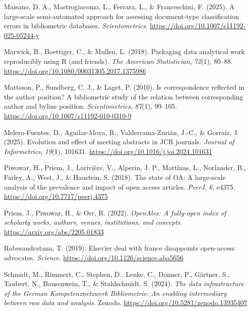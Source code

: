 \documentclass[a4paper,man,floatsintext,longtable,noextraspace,10pt]{apa6}
\newlength{\cslhangindent}
\newenvironment{CSLReferences}[2] %
{\begin{list}{}{%
  \setlength{\itemindent}{0pt}
  \setlength{\leftmargin}{0pt}
  \setlength{\parsep}{0pt}
  \ifodd #1
  \setlength{\leftmargin}{\cslhangindent}
  \setlength{\itemindent}{-1\cslhangindent}
  \fi
  \setlength{\itemsep}{#2\baselineskip}}}
{\end{list}}
\begin{document}
\begin{CSLReferences}{1}{0}
Maisano, D. A., Mastrogiacomo, L., Ferrara, L., \& Franceschini, F.
(2025). A large-scale semi-automated approach for assessing
document-type classification errors in bibliometric databases.
\emph{Scientometrics}. \url{https://doi.org/10.1007/s11192-025-05244-y}

Marwick, B., Boettiger, C., \& Mullen, L. (2018). Packaging data
analytical work reproducibly using {R} (and friends). \emph{The American
Statistician}, \emph{72}(1), 80--88.
\url{https://doi.org/10.1080/00031305.2017.1375986}

Mattsson, P., Sundberg, C. J., \& Laget, P. (2010). Is correspondence
reflected in the author position? A bibliometric study of the relation
between corresponding author and byline position. \emph{Scientometrics},
\emph{87}(1), 99--105. \url{https://doi.org/10.1007/s11192-010-0310-9}

Melero-Fuentes, D., Aguilar-Moya, R., Valderrama-Zurián, J.-C., \&
Gorraiz, J. (2025). Evolution and effect of meeting abstracts in JCR
journals. \emph{Journal of Informetrics}, \emph{19}(1), 101631.
\url{https://doi.org/10.1016/j.joi.2024.101631}

Piwowar, H., Priem, J., Larivière, V., Alperin, J. P., Matthias, L.,
Norlander, B., Farley, A., West, J., \& Haustein, S. (2018). The state
of {OA}: A large-scale analysis of the prevalence and impact of open
access articles. \emph{{PeerJ}}, \emph{6}, e4375.
\url{https://doi.org/10.7717/peerj.4375}

Priem, J., Piwowar, H., \& Orr, R. (2022). \emph{OpenAlex: A fully-open
index of scholarly works, authors, venues, institutions, and concepts}.
\url{https://arxiv.org/abs/2205.01833}

Rabesandratana, T. (2019). Elsevier deal with france disappoints
open-access advocates. \emph{Science}.
\url{https://doi.org/10.1126/science.aba5656}

Schmidt, M., Rimmert, C., Stephen, D., Lenke, C., Donner, P., Gärtner,
S., Taubert, N., Bausenwein, T., \& Stahlschmidt, S. (2024). \emph{The
data infrastructure of the {German Kompetenznetzwerk Bibliometrie}: An
enabling intermediary between raw data and analysis}. Zenodo.
\url{https://doi.org/10.5281/zenodo.13935407}


\end{CSLReferences}
\end{document}
